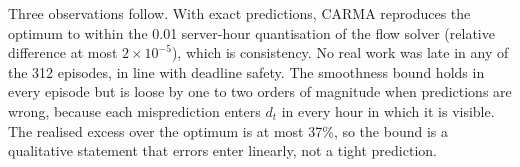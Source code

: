 Three observations follow. With exact predictions, CARMA reproduces the optimum to within the 0.01 server-hour quantisation of the flow solver (relative difference at most $2\times10^{-5}$), which is consistency. No real work was late in any of the 312 episodes, in line with deadline safety. The smoothness bound holds in every episode but is loose by one to two orders of magnitude when predictions are wrong, because each misprediction enters $d_t$ in every hour in which it is visible. The realised excess over the optimum is at most 37\%, so the bound is a qualitative statement that errors enter linearly, not a tight prediction.
